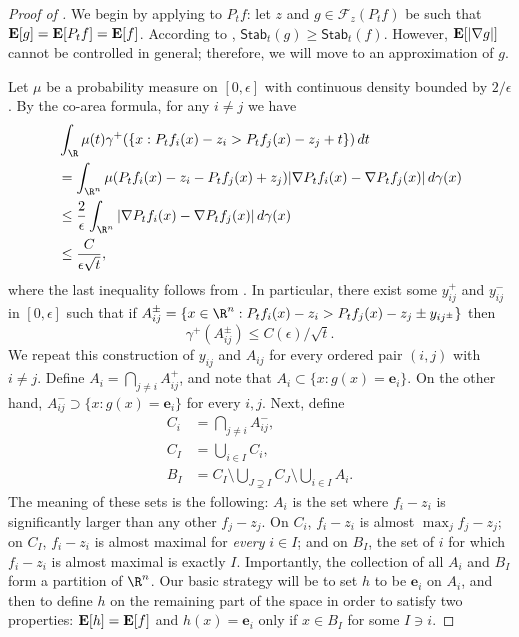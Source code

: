 \documentclass{toc}
\newcommand{\E}{{\bf E}}
\newcommand{\calF}{\mathcal{F}}
\newcommand{\Stab}{\mathsf{Stab}}
\begin{document}
\begin{proof}[Proof of ]
We begin by applying  to $P_t f$: let $z$ and $g \in \calF_z(P_t f)$
be such that $\E[g] = \E[P_t f] = \E[f]$. According to , $\Stab_t(g) \ge \Stab_t(f)$.
However, $\E[|\nabla g|]$ cannot be controlled in general; therefore, we will move to an approximation of $g$.

Let $\mu$ be a probability measure on $[0, \epsilon]$ with continuous density bounded by $2/\epsilon$.
By the co-area formula, for any $i \ne j$ we have
\begin{align*}
  &\int_\R \mu(t) \gamma^+(\{x: P_t f_i(x) - z_i > P_t f_j(x) - z_j + t\})\, dt \\
  &= \int_{\R^n} \mu(P_t f_i(x) - z_i - P_t f_j(x) + z_j) |\nabla P_t f_i(x) - \nabla P_t f_j(x)|\, d\gamma(x) \\
  &\le \frac{2}{\epsilon} \int_{\R^n} |\nabla P_t f_i(x) - \nabla P_t f_j(x)|\, d\gamma(x) \\
  &\le \frac{C}{\epsilon \sqrt t},
\end{align*}
where the last inequality follows from .
In particular, there exist some $y_{ij}^+$ and $y_{ij}^-$ in $[0, \epsilon]$ such that if
$A_{ij}^{\pm} = \{x \in \R^n: P_t f_i(x) - z_i > P_t f_j(x) - z_j \pm y_{ij^{\pm}}\}$ then
\[
\gamma^+(A_{ij}^\pm) \le C(\epsilon)/\sqrt t.
\]
We repeat this construction of $y_{ij}$ and $A_{ij}$ for every ordered pair $(i, j)$ with $i \ne j$.
Define $A_i = \bigcap_{j \ne i} A_{ij}^+$, and note that $A_i \subset \{x: g(x) = \mathbf{e}_i\}$.
On the other hand, $A_{ij}^- \supset \{x: g(x) = \mathbf{e}_i\}$ for every $i, j$.
Next, define
\begin{align*}
  C_i &= \bigcap_{j \ne i} A_{ij}^-, \\
  C_I &= \bigcup_{i \in I} C_i, \\
  B_I &= C_I \setminus \bigcup_{J \supsetneq I} C_J \setminus \bigcup_{i \in I} A_i.
\end{align*}
The meaning of these sets is the following: $A_i$ is the set where $f_i - z_i$ is significantly larger than
any other
$f_j - z_j$. On $C_i$, $f_i - z_i$ is almost $\max_j f_j - z_j$;
on $C_I$, $f_i - z_i$ is almost maximal for \emph{every} $i \in I$; and on $B_I$, the set
of $i$ for which $f_i - z_i$ is almost maximal is exactly $I$. Importantly, the collection
of all $A_i$ and $B_I$ form a partition of $\R^n$. Our basic strategy will be to set $h$ to be $\mathbf{e}_i$
on $A_i$, and then to define $h$ on the remaining part of the space in order to satisfy two properties:
$\E[h] = \E[f]$ and $h(x) = \mathbf{e}_i$ only if $x \in B_I$ for some $I \ni i$.


\end{proof}
\end{document}
